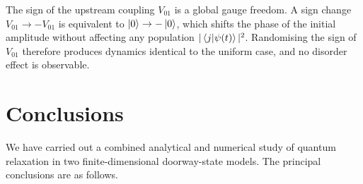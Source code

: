 \documentclass[aps,prx,reprint,showpacs,showkeys,floatfix]{revtex4-2}
\begin{document}
The sign of the upstream coupling $V_{01}$ is a global gauge freedom.  A
sign change $V_{01}\to -V_{01}$ is equivalent to $\ket{0}\to -\ket{0}$,
which shifts the phase of the initial amplitude without affecting any
population $|\braket{j|\psi(t)}|^{2}$.  Randomising the sign of $V_{01}$
therefore produces dynamics identical to the uniform case, and no disorder
effect is observable.

\section{Conclusions}

We have carried out a combined analytical and numerical study of quantum
relaxation in two finite-dimensional doorway-state models.  The principal
conclusions are as follows.
\end{document}
